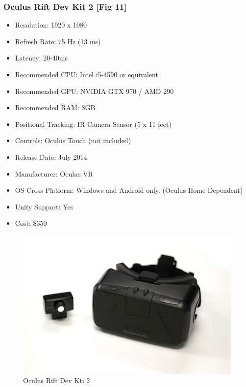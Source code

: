 \documentclass[a4paper,10pt]{article}
\begin{document}
\subsubsection{Oculus Rift Dev Kit 2 [Fig 11]}
\begin{itemize}
	\item Resolution: 1920 x 1080
	\item Refresh Rate: 75 Hz (13 ms)
	\item Latency: 20-40ms
	\item Recommended CPU: Intel i5-4590 or equivalent
	\item Recommended GPU: NVIDIA GTX 970 / AMD 290 
	\item Recommended RAM: 8GB
	\item Positional Tracking: IR Camera Sensor (5 x 11 feet)
	\item Controls: Oculus Touch (not included)
	\item Release Date: July 2014
	\item Manufacturer: Oculus VR
	\item OS Cross Platform: Windows and Android only. (Oculus Home Dependent)
	\item Unity Support: Yes
	\item Cost: \$350
\end{itemize}
\begin{figure}[H]
	\includegraphics[width=\linewidth,height=\paperheight,keepaspectratio]{dk2.jpg}
	\caption{Oculus Rift Dev Kti 2}
	\label{fig:Riftdk2Img}
	\end{figure}
	\pagebreak
\end{document}

